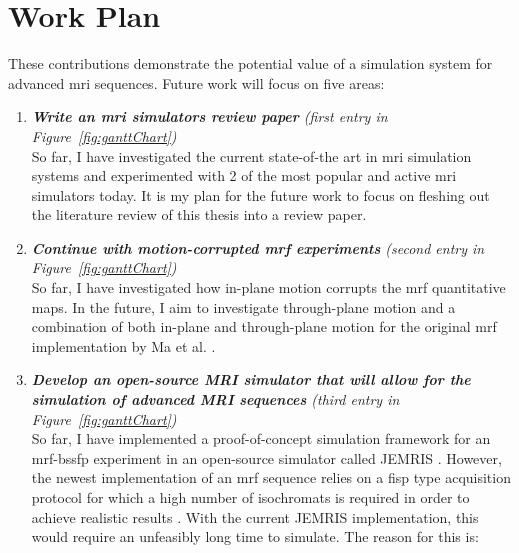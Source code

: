 \section{Work Plan}\label{chapterlabel4sec2}

These contributions demonstrate the potential value of a simulation system for advanced \ac{mri} sequences. 
Future work will focus on five areas:


\begin{enumerate}
    \item \textit{\textbf{Write an \ac{mri} simulators review paper} (first entry in Figure~\ref{fig:ganttChart})} \\
    So far, I have investigated the current state-of-the art in \ac{mri} simulation systems and experimented with 2 of the most popular and active \ac{mri} simulators today.
    It is my plan for the future work to focus on fleshing out the literature review of this thesis into a review paper.
    
	\item \textit{\textbf{Continue with motion-corrupted \ac{mrf} experiments} (second entry in Figure~\ref{fig:ganttChart})} \\
	So far, I have investigated how in-plane motion corrupts the \ac{mrf} quantitative maps.
	In the future, I aim to investigate through-plane motion and a combination of both in-plane and through-plane motion for the original \ac{mrf} implementation by Ma et al. \cite{Ma2013}.
	
	\item \textit{\textbf{Develop an open-source MRI simulator that will allow for the simulation of advanced MRI sequences} (third entry in Figure~\ref{fig:ganttChart})} \\
	
	So far, I have implemented a proof-of-concept simulation framework for an \ac{mrf}-\ac{bssfp} experiment in an open-source simulator called JEMRIS \cite{Stocker2010}.
	However, the newest implementation of an \ac{mrf} sequence relies on a \ac{fisp} type acquisition protocol for which a high number of isochromats is required in order to achieve realistic results \cite{Hennig1991}.
	With the current JEMRIS implementation, this would require an unfeasibly long time to simulate.
	The reason for this is:
	

\end{enumerate}
